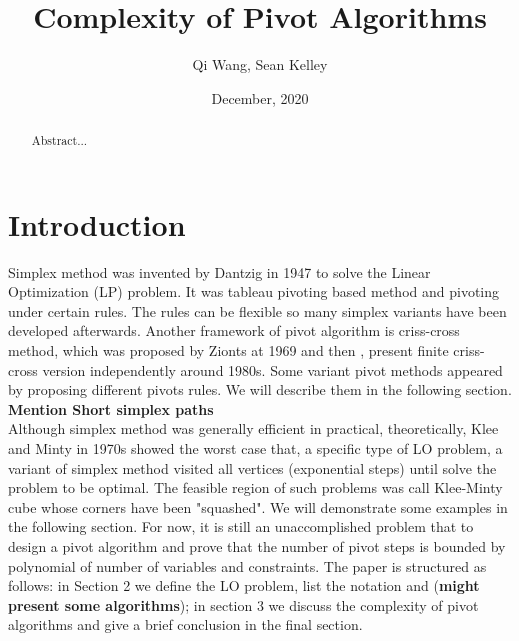 \documentclass[11pt]{article}
\begin{document}
\title{Complexity of Pivot Algorithms}
\author{Qi Wang, Sean Kelley}
\date{December, 2020}
\maketitle


\begin{abstract}
Abstract...
\end{abstract}


\section{Introduction}
Simplex method was invented by Dantzig in 1947 \cite{dantzig1951maximization} to solve the Linear Optimization (LP) problem. It was tableau pivoting based method and pivoting under certain rules. The rules can be flexible so many simplex variants have been developed afterwards. Another framework of pivot algorithm is criss-cross method, which was proposed by Zionts at 1969 \cite{fukuda1997criss} and then \cite{terlaky1987finite}, \cite{chang1979least} present finite criss-cross version independently around 1980s. Some variant pivot methods appeared by proposing different pivots rules. We will describe them in the following section. \textbf{Mention Short simplex paths}\\
Although simplex method was generally efficient in practical, theoretically, Klee and Minty \cite{wikipediacontributors_2020_kleeminty} in 1970s showed the worst case that, a specific type of LO problem, a variant of simplex method visited all vertices (exponential steps) until solve the problem to be optimal. The feasible region of such problems was call Klee-Minty cube whose corners have been "squashed". We will demonstrate some examples in the following section. For now, it is still an unaccomplished problem that to design a pivot algorithm and prove that the number of pivot steps is bounded by polynomial of number of variables and constraints.
The paper is structured as follows: in Section 2 we define the LO problem, list the notation and (\textbf{might present some algorithms}); in section 3 we discuss the complexity of pivot algorithms and give a brief conclusion in the final section.
\end{document}
